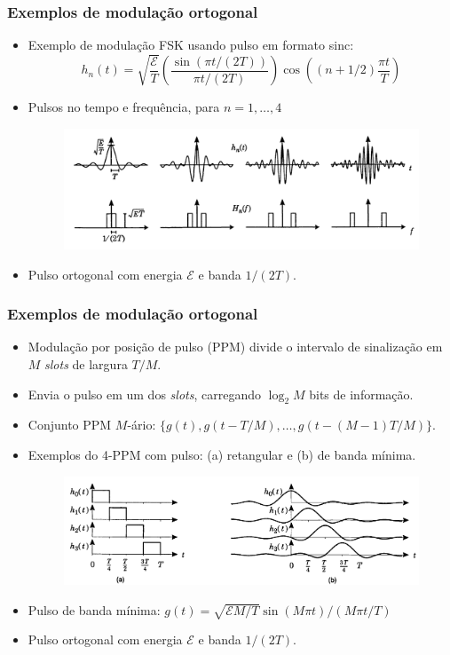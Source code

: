 \begin{frame}
	\frametitle{Exemplos de modulação ortogonal}

	\begin{itemize}
	    \item Exemplo de modulação FSK usando pulso em formato sinc:
	    \begin{equation*}
		h_n(t) = \sqrt{\frac{\mathcal{E}}{T}}\left( \frac{\sin(\pi t / (2T))}{\pi t/(2T)} \right) \cos \left( (n+ 1/2) \frac{\pi t}{T} \right)
	    \end{equation*}
	    \item Pulsos no tempo e frequência, para $n=1,\ldots,4$
	    \begin{figure}[t]	
		\begin{center}
		\includegraphics[width=0.85\columnwidth]{figs/adv_11}
		\end{center}
	    \end{figure}
	    \item Pulso ortogonal com energia $\mathcal{E}$ e banda $1/(2T)$.
	\end{itemize}	
\end{frame}

\begin{frame}
	\frametitle{Exemplos de modulação ortogonal}

	\begin{itemize}
	    \item Modulação por posição de pulso (PPM) divide o intervalo de sinalização em $M$ \textit{slots} de largura $T/M$.
	    \item Envia o pulso em um dos \textit{slots}, carregando $\log_2 M$ bits de informação.
	    \item Conjunto PPM $M$-ário: $\{g(t), g(t-T/M), \ldots, g(t-(M-1)T/M) \}$.
	    \item Exemplos do 4-PPM com pulso: (a) retangular e (b) de banda mínima.
	    \begin{figure}[t]	
		\begin{center}
		\includegraphics[width=0.8\columnwidth]{figs/adv_12}
		\end{center}
	    \end{figure}
	    \item Pulso de banda mínima: $g(t) = \sqrt{\mathcal{E}M/T}\sin(M\pi t)/(M\pi t/T)$
	    \item Pulso ortogonal com energia $\mathcal{E}$ e banda $1/(2T)$.
	\end{itemize}	
\end{frame}

